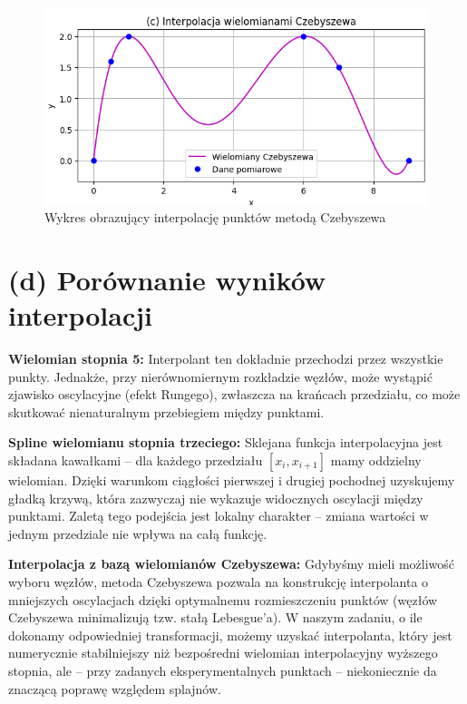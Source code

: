 \documentclass{article}
\begin{document}
\begin{figure}[H]
    \centering
    \includegraphics[width=1\linewidth]{Wielomiany_Czebyszewa.png}
    \caption{Wykres obrazujący interpolację punktów metodą Czebyszewa}
    \label{fig:cheby}
\end{figure}

\bigskip

\section*{(d) Porównanie wyników interpolacji}
\textbf{Wielomian stopnia 5:}  
Interpolant ten dokładnie przechodzi przez wszystkie punkty. Jednakże, przy nierównomiernym rozkładzie węzłów, może wystąpić zjawisko oscylacyjne (efekt Rungego), zwłaszcza na krańcach przedziału, co może skutkować nienaturalnym przebiegiem między punktami.

\medskip

\textbf{Spline wielomianu stopnia trzeciego:}  
Sklejana funkcja interpolacyjna jest składana kawałkami – dla każdego przedziału \( [x_i, x_{i+1}] \) mamy oddzielny wielomian. Dzięki warunkom ciągłości pierwszej i drugiej pochodnej uzyskujemy gładką krzywą, która zazwyczaj nie wykazuje widocznych oscylacji między punktami. Zaletą tego podejścia jest lokalny charakter – zmiana wartości w jednym przedziale nie wpływa na całą funkcję.

\medskip

\textbf{Interpolacja z bazą wielomianów Czebyszewa:}  
Gdybyśmy mieli możliwość wyboru węzłów, metoda Czebyszewa pozwala na konstrukcję interpolanta o mniejszych oscylacjach dzięki optymalnemu rozmieszczeniu punktów (węzłów Czebyszewa minimalizują tzw. stałą Lebesgue’a). W naszym zadaniu, o ile dokonamy odpowiedniej transformacji, możemy uzyskać interpolanta, który jest numerycznie stabilniejszy niż bezpośredni wielomian interpolacyjny wyższego stopnia, ale – przy zadanych eksperymentalnych punktach – niekoniecznie da znaczącą poprawę względem splajnów.
\end{document}
